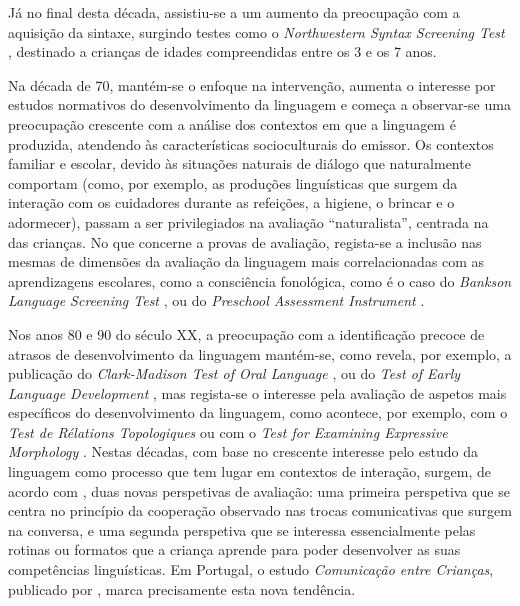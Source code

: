 \documentclass[output=paper]{LSP/langsci}
\begin{document}
Já no final desta década, assistiu-se a um aumento da preocupação com a aquisição da sintaxe, surgindo testes como o \textit{Northwestern Syntax Screening Test} \citep{lee1969}, destinado a crianças de idades compreendidas entre os 3 e os 7 anos. 

Na década de 70, mantém-se o enfoque na intervenção, aumenta o interesse por estudos normativos do desenvolvimento da linguagem e começa a observar-se uma preocupação crescente com a análise dos contextos em que a linguagem é produzida, atendendo às características socioculturais do emissor. Os contextos familiar e escolar, devido às situações naturais de diálogo que naturalmente comportam (como, por exemplo, as produções linguísticas que surgem da interação com os cuidadores durante as refeições, a higiene, o brincar e o adormecer), passam a ser privilegiados na avaliação “naturalista”, centrada na  das crianças. No que concerne a provas de avaliação, regista-se a inclusão nas mesmas de dimensões da avaliação da linguagem mais correlacionadas com as aprendizagens escolares, como a consciência fonológica, como é o caso do \textit{Bankson Language Screening Test} \citep{bankson1977}, ou do \textit{Preschool Assessment Instrument} \citep{blank_etal1978}.

Nos anos 80 e 90 do século XX, a preocupação com a identificação precoce de atrasos de desenvolvimento da linguagem mantém-se, como revela, por exemplo, a publicação do\textit{ Clark-Madison Test of Oral Language} \citep{clarkmadison1981}, ou do \textit{Test of Early Language Development} \citep{hresko_etal1981}, mas regista-se o interesse pela avaliação de aspetos mais específicos do desenvolvimento da linguagem, como acontece, por exemplo, com o \textit{Test de Rélations Topologiques} \citep{deiltourhupkens1980} ou com o \textit{Test for Examining Expressive Morphology} \citep{shipley_etal1983}. Nestas décadas, com base no crescente interesse pelo estudo da linguagem como processo que tem lugar em contextos de interação, surgem, de acordo com \citet{acosta2006}, duas novas perspetivas de avaliação: uma primeira perspetiva que se centra no princípio da cooperação observado nas trocas comunicativas que surgem na conversa, e uma segunda perspetiva que se interessa essencialmente pelas rotinas ou formatos que a criança aprende para poder desenvolver as suas competências linguísticas. Em Portugal, o estudo \textit{Comunicação entre Crianças}, publicado por \citet{simoes1990}, marca precisamente esta nova tendência. 
\end{document}
